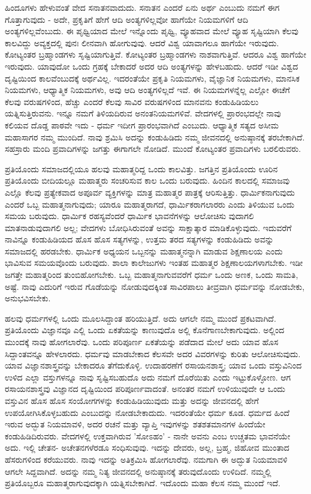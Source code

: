 ಹಿಂದೂಗಳು ಹೇಳುವಂತೆ ವೇದ ಸನಾತನವಾದುದು. ಸನಾತನ ಎಂದರೆ ಏನು ಅರ್ಥ ಎಂಬುದು ನಮಗೆ ಈಗ ಗೊತ್ತಾಗುವುದು - ಅದೇ, ಪ್ರಕೃತಿಗೆ ಹೇಗೆ ಆದಿ ಅಂತ್ಯಗಳಿಲ್ಲವೋ ಹಾಗೆಯೇ ನಿಯಮಗಳಿಗೆ ಆದಿ ಅಂತ್ಯಗಳಿಲ್ಲವೆಂಬುದು. ಈ ಪೃಥ್ವಿಯಾದ ಮೇಲೆ ಇನ್ನೊಂದು ಪೃಥ್ವಿ, ವ್ಯೂಹವಾದ ಮೇಲೆ ವ್ಯೂಹ ಸೃಷ್ಟಿಯಾಗಿ ಕೆಲವು ಕಾಲವಿದ್ದು ಅವ್ಯಕ್ತದಲ್ಲಿ ಪುನಃ ಲೀನವಾಗಿ ಹೋಗುವುವು. ಆದರೆ ವಿಶ್ವ ಯಾವಾಗಲೂ ಹಾಗೆಯೇ ಇರುವುದು. ಕೋಟ್ಯಂತರ ಬ್ರಹ್ಮಾಂಡಗಳು ಸೃಷ್ಟಿಯಾಗುತ್ತಿವೆ. ಕೋಟ್ಯಂತರ ಬ್ರಹ್ಮಾಂಡಗಳು ನಾಶವಾಗುತ್ತಿವೆ. ಆದರೂ ವಿಶ್ವ ಹಾಗೆಯೇ ಇರುವುದು. ಯಾವುದೋ ಒಂದು ಗ್ರಹಕ್ಕೆ ಬೇಕಾದರೆ ಅದರ ಆದಿ ಅಂತ್ಯಗಳನ್ನು ಹೇಳಬಹುದು. ಆದರೆ ಇಡೀ ವಿಶ್ವದ ದೃಷ್ಟಿಯಿಂದ ಕಾಲವೆಂಬುದಕ್ಕೆ ಅರ್ಥವಿಲ್ಲ. ಇದರಂತೆಯೇ ಪ್ರಕೃತಿ ನಿಯಮಗಳು, ವೈಜ್ಞಾನಿಕ ನಿಯಮಗಳು, ಮಾನಸಿಕ ನಿಯಮಗಳು, ಆಧ್ಯಾತ್ಮಿಕ ನಿಯಮಗಳು, ಅವು ಆದಿ ಅಂತ್ಯಗಳಿಲ್ಲದೆ ಇವೆ. ಈ ನಿಯಮಗಳನ್ನೆಲ್ಲ ಎಲ್ಲೋ ಈಚೆಗೆ ಕೆಲವು ವರುಷಗಳಿಂದ, ಹೆಚ್ಚು ಎಂದರೆ ಕೆಲವು ಸಾವಿರ ವರುಷಗಳಿಂದ ಮಾನವನು ಕಂಡುಹಿಡಿಯಲು ಯತ್ನಿಸುತ್ತಿರುವನು. ಇನ್ನೂ ನಮಗೆ ತಿಳಿಯದಿರುವ ಅನಂತನಿಯಮಗಳಿವೆ. ವೇದಗಳಲ್ಲಿ ಪ್ರಾರಂಭದಲ್ಲೇ ನಾವು ಕಲಿಯವ ದೊಡ್ಡ ಪಾಠವೇ ಇದು - ಧರ್ಮ ಇದೀಗ ಪ್ರಾರಂಭವಾಗಿದೆ ಎಂಬುದು. ಆಧ್ಯಾತ್ಮಿಕ ಸತ್ಯದ ಅಸೀಮ ಮಹಾಸಾಗರ ನಮ್ಮ ಮುಂದಿದೆ. ನಾವು ಶ್ರಮಿಸಿ ಅದನ್ನು ಕಂಡುಹಿಡಿದು ನಮ್ಮ ಜೀವನದಲ್ಲಿ ಅನುಷ್ಠಾನಕ್ಕೆ ತರಬೇಕಾಗಿದೆ. ಸಹಸ್ರಾರು ಮಂದಿ ಪ್ರವಾದಿಗಳನ್ನು ಜಗತ್ತು ಈಗಾಗಲೇ ನೋಡಿದೆ. ಮುಂದೆ ಕೋಟ್ಯಂತರ ಪ್ರವಾದಿಗಳು ಬರಲಿರುವರು.

ಪ್ರತಿಯೊಂದು ಸಮಾಜದಲ್ಲಿಯೂ ಹಲವು ಮಹಾತ್ಮರಿದ್ದ ಒಂದು ಕಾಲವಿತ್ತು. ಜಗತ್ತಿನ ಪ್ರತಿಯೊಂದು ಊರಿನ ಪ್ರತಿಯೊಂದು ಬೀದಿಯಲ್ಲೂ ಮಹಾತ್ಮರು ಸಂಚರಿಸುವ ಕಾಲ ಒಂದು ಬರುವುದು. ಹಿಂದಿನ ಕಾಲದಲ್ಲಿ ಸಮಾಜವು ಎಲ್ಲೊ ಕೆಲವು ಪ್ರತ್ಯೇಕವಾದ ಅಪೂರ್ವ ವ್ಯಕ್ತಿಗಳನ್ನು ಮಾತ್ರ ಮಹಾತ್ಮರ ಪಾತ್ರಕ್ಕೆ ಆರಿಸುತ್ತಿತ್ತು. ಧಾರ್ಮಿಕನಾಗುವುದು ಎಂದರೆ ಒಬ್ಬ ಮಹಾತ್ಮನಾಗುವುದು; ಯಾರೂ ಮಹಾತ್ಮರಾಗದೆ, ಧಾರ್ಮಿಕರಾಗಲಾರರು ಎಂದು ತಿಳಿಯುವ ಒಂದು ಸಮಯ ಬರುವುದು. ಧಾರ್ಮಿಕ ರಹಸ್ಯವೆಂದರೆ ಧಾರ್ಮಿಕ ಭಾವನೆಗಳನ್ನು ಆಲೋಚಿಸು ವುದಾಗಲಿ ಮಾತನಾಡುವುದಾಗಲಿ ಅಲ್ಲ; ವೇದಗಳು ಬೋಧಿಸಿರುವಂತೆ ಅವನ್ನು ಸಾಕ್ಷಾತ್ಕಾರ ಮಾಡಿಕೊಳ್ಳುವುದು. ಇದುವರೆಗೆ ನಾವಿನ್ನೂ ಕಂಡುಹಿಡಿಯದ ಹೊಸ ಹೊಸ ಸತ್ಯಗಳನ್ನು, ಉತ್ತಮ ತರದ ಸತ್ಯಗಳನ್ನು ಕಂಡುಹಿಡಿದು ಅವನ್ನು ಸಮಾಜದಲ್ಲಿ ಹರಡಬೇಕು. ಧಾರ್ಮಿಕ ಅಧ್ಯಯನ ಒಬ್ಬನನ್ನು ಮಹಾತ್ಮನನ್ನಾಗಿ ಮಾಡುವ ಶಿಕ್ಷಣಾಲಯ ಎಂದು ಭಾವಿಸುವ ಸಮಯವೊಂದು ಬರುವುದು. ಶಾಲಾ ಕಾಲೇಜುಗಳು ಇಂತಹ ಮಹಾತ್ಮರ ಶಿಕ್ಷಣಾಲಯಗಳಾಗಬೇಕು. ಇಡೀ ಜಗತ್ತೇ ಮಹಾತ್ಮರಿಂದ ತುಂಬಿಹೋಗಬೇಕು. ಒಬ್ಬ ಮಹಾತ್ಮನಾಗುವವರೆಗೆ ಧರ್ಮ ಒಂದು ಅಣಕ, ಒಂದು ಸಾಮತಿ, ಅಷ್ಟೆ. ನಾವು ಎದುರಿಗೆ ಇರುವ ಗೊಡೆಯನ್ನು ನೋಡುವುದಕ್ಕಿಂತ ಸಾವಿರಪಾಲು ತೀವ್ರವಾಗಿ ಧರ್ಮವನ್ನು ನೋಡಬೇಕು, ಅನುಭವಿಸಬೇಕು.

ಹಲವು ಧರ್ಮಗಳಲ್ಲಿ ಒಂದು ಮೂಲಸಿದ್ದಾಂತ ಹರಿಯುತ್ತಿದೆ. ಅದು ಆಗಲೇ ನಮ್ಮ ಮುಂದೆ ಪ್ರಕಟವಾಗಿದೆ. ಪ್ರತಿಯೊಂದು ವಿಜ್ಞಾನವೂ ಎಲ್ಲಿ ಒಂದು ಏಕತೆಯನ್ನು ಕಾಣುವುದೊ ಅಲ್ಲಿ ಕೊನೆಗಾಣಬೇಕಾಗುವುದು. ಅಲ್ಲಿಂದ ಮುಂದಕ್ಕೆ ನಾವು ಹೋಗಲಾರೆವು. ಒಂದು ಪರಿಪೂರ್ಣ ಏಕತೆಯನ್ನು ಪಡೆದಾದ ಮೇಲೆ ಅದು ಯಾವ ಹೊಸ ಸಿದ್ದಾಂತವನ್ನೂ ಹೇಳಲಾರದು. ಧರ್ಮವು ಮಾಡಬೇಕಾದ ಕೆಲಸವೇ ಅದರ ವಿವರಗಳನ್ನು ಕುರಿತು ಆಲೋಚಿಸುವುದು. ಯಾವ ವಿಜ್ಞಾನಶಾಸ್ತ್ರವನ್ನು ಬೇಕಾದರೂ ತೆಗೆದುಕೊಳ್ಳಿ. ಉದಾಹರಣೆಗೆ ರಸಾಯನಶಾಸ್ತ್ರ; ಯಾವ ಒಂದು ವಸ್ತುವಿನಿಂದ ಉಳಿದ ಎಲ್ಲಾ ವಸ್ತುಗಳನ್ನೂ ನಾವು ಸೃಷ್ಟಿಸಬಹುದೊ ಅದು ನಮಗೆ ದೊರೆಯಿತು ಎಂದು ಇಟ್ಟುಕೊಳ್ಳೋಣ. ಆಗ ರಸಾಯನಶಾಸ್ತ್ರವು ವಿಜ್ಞಾನದ ದೃಷ್ಟಿಯಿಂದ ಪರಿಪೂರ್ಣವಾದಂತೆ. ಅನಂತರ ನಮಗೆ ಉಳಿಯುವುದೇ ಆ ಒಂದು ವಸ್ತುವಿನ ಹೊಸ ಹೊಸ ಸಂಯೋಗಗಳನ್ನು ಕಂಡುಹಿಡಿಯುವುದು ಮತ್ತು ಅದನ್ನು ಜೀವನದಲ್ಲಿ ಹೇಗೆ ಉಪಯೋಗಿಸಿಕೊಳ್ಳಬಹುದು ಎಂಬುದನ್ನು ನೋಡಬೇಕಾದುದು. ಇದರಂತೆಯೇ ಧರ್ಮ ಕೂಡ. ಧರ್ಮದ ಹಿಂದೆ ಇರುವ ಅದ್ಭುತ ನಿಯಮಾವಳಿ, ಅದರ ರಚನೆ ಮತ್ತು ವ್ಯಾಪ್ತಿ ಇವುಗಳನ್ನು ಶತಶತಮಾನಗಳ ಹಿಂದೆಯೇ ಕಂಡುಹಿಡಿದಿರುವರು. ವೇದಗಳಲ್ಲಿ ಉಕ್ತವಾಗಿರುವ 'ಸೋಽಹಂ' - ನಾನೇ ಅವನು ಎಂಬ ಉಚ್ಚತಮ ಭಾವನೆಯೇ ಅದು. ಇಲ್ಲಿ ಚೇತನ- ಅಚೇತನಗಳೆರಡೂ ಸಂಧಿಸುವುವು. ಇದನ್ನು ದೇವರು, ಅಲ್ಲ, ಬ್ರಹ್ಮ, ಜಿಹೋವ ಮುಂತಾದ ಹೆಸರುಗಳಿಂದ ಕರೆಯುವರು. ನಾವು ಇದನ್ನು ಅತಿಕ್ರಮಿಸಿ ಹೋಗಲಾರೆವು. ನಮಗಾಗಿ ಈ ಅದ್ಭುತ ನಿಯಮಾವಳಿ ಆಗಲೇ ಸಿದ್ದವಾಗಿದೆ. ಅದನ್ನು ನಮ್ಮ ನಿತ್ಯ ಜೀವನದಲ್ಲಿ ಅನುಷ್ಠಾನಕ್ಕೆ ತರುವುದೊಂದು ಉಳಿದಿದೆ. ನಮ್ಮಲ್ಲಿ ಪ್ರತಿಯೊಬ್ಬರೂ ಮಹಾತ್ಮರಾಗುವುದಕ್ಕಾಗಿ ಯತ್ನಿಸಬೇಕಾಗಿದೆ. ಇದೊಂದು ಮಹಾ ಕೆಲಸ ನಮ್ಮ ಮುಂದೆ ಇದೆ.

